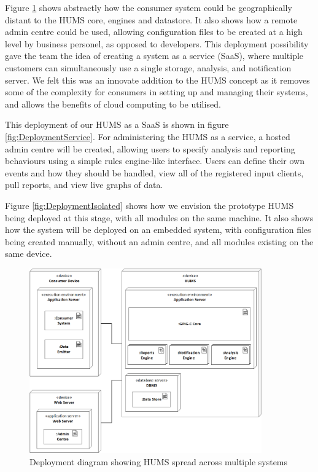 \documentclass[10pt,a4paper]{article}
\begin{document}
Figure \ref{fig:DeploymentDistributed} shows abstractly how the consumer system could be geographically distant to the HUMS core, engines and datastore. It also shows how a remote admin centre could be used, allowing configuration files to be created at a high level by business personel, as opposed to developers. This deployment possibility gave the team the idea of creating a system as a service (SaaS), where multiple customers can simultaneously use a single storage, analysis, and notification server. We felt this was an innovate addition to the HUMS concept as it removes some of the complexity for consumers in setting up and managing their systems, and allows the benefits of cloud computing to be utilised.

This deployment of our HUMS as a SaaS is shown in figure \ref{fig:DeploymentService}. For administering the HUMS as a service, a hosted admin centre will be created, allowing users to specify analysis and reporting behaviours using a simple rules engine-like interface. Users can define their own events and how they should be handled, view all of the registered input clients, pull reports, and view live graphs of data.

Figure \ref{fig:DeploymentIsolated} shows how we envision the prototype HUMS being deployed at this stage, with all modules on the same machine. It also shows how the system will be deployed on an embedded system, with configuration files being created manually, without an admin centre, and all modules existing on the same device.
\begin{figure}[!ht]
  \centering
  \includegraphics[width=10cm]{images/DeploymentDistributed.png}
  \caption{Deployment diagram showing HUMS spread across multiple 
systems}
  \label{fig:DeploymentDistributed}
\end{figure}
\end{document}
